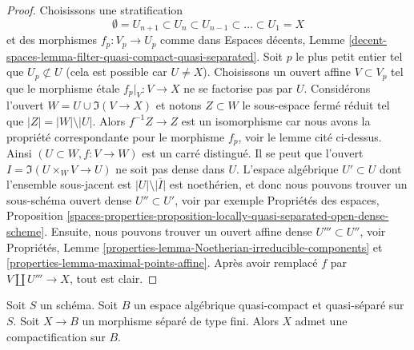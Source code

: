\begin{proof}
Choisissons une stratification
$$
\emptyset = U_{n + 1} \subset
U_n \subset U_{n - 1} \subset \ldots \subset U_1 = X
$$
et des morphismes $f_p : V_p \to U_p$ comme dans Espaces décents, Lemme
\ref{decent-spaces-lemma-filter-quasi-compact-quasi-separated}.
Soit $p$ le plus petit entier tel que $U_p \not \subset U$
(cela est possible car $U \not = X$). Choisissons un ouvert affine $V \subset V_p$
tel que le morphisme \'etale $f_p|_V : V \to X$ ne se factorise pas par $U$.
Considérons l'ouvert $W = U \cup \Im(V \to X)$ et notons $Z \subset W$ le sous-espace fermé réduit tel que $|Z| = |W| \setminus |U|$.
Alors $f^{-1}Z \to Z$ est un isomorphisme car nous avons la
propriété correspondante pour le morphisme $f_p$, voir le lemme cité ci-dessus.
Ainsi $(U \subset W, f : V \to W)$ est un carré distingué.
Il se peut que l'ouvert $I = \Im(U \times_W V \to U)$
ne soit pas dense dans $U$. L'espace algébrique $U' \subset U$ dont l'ensemble
sous-jacent est $|U| \setminus \overline{|I|}$ est noethérien, et donc nous pouvons trouver un sous-schéma ouvert dense $U'' \subset U'$, voir par exemple Propriétés des espaces, Proposition \ref{spaces-properties-proposition-locally-quasi-separated-open-dense-scheme}. Ensuite, nous pouvons trouver un ouvert affine dense $U''' \subset U''$, voir Propriétés, Lemme \ref{properties-lemma-Noetherian-irreducible-components} et \ref{properties-lemma-maximal-points-affine}. Après avoir remplacé $f$ par $V \amalg U''' \to X$, tout est clair. 
\end{proof}

\begin{theorem}
\label{theorem-nagata}
\begin{reference}
\cite{CLO}
\end{reference}
Soit $S$ un schéma. Soit $B$ un espace algébrique quasi-compact et
quasi-séparé sur $S$. Soit $X \to B$ un morphisme séparé de type fini.
Alors $X$ admet une compactification sur $B$.
\end{theorem}

